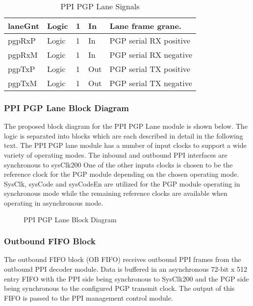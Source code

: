 \documentclass[11pt]{article}
\begin{document}
\begin{table}[H]
\begin{tabular}{| l | l | l | l | l | }
      \hline laneGnt           & Logic              & 1      & In        & Lane frame grane.             \\
      \hline pgpRxP            & Logic             & 1    & In        & PGP serial RX positive     \\
      \hline pgpRxM            & Logic             & 1  & In        & PGP serial RX negative     \\
      \hline pgpTxP            & Logic             & 1   & Out       & PGP serial TX positive     \\
      \hline pgpTxM            & Logic             & 1    & Out       & PGP serial TX negative     \\
      \hline
   \end{tabular}
   \caption{PPI PGP Lane Signals}
   \label{tab:ppi_pgp_lane_signals}
\end{table}

\subsubsection{PPI PGP Lane Block Diagram}

The proposed block diagram for the PPI PGP Lane module is shown below. The logic is separated into blocks which are each 
described in detail in the following text. The PPI PGP lane module has a number of input clocks to support a wide variety of operating
modes. The inbound and outbound PPI interfaces are synchronous to sysClk200 
One of the other inputs clocks is chosen to be the reference clock for the PGP module depending on the chosen operating mode. 
SysClk, sysCode and sysCodeEn are utilized for the PGP module operating in synchronous mode while the remaining 
reference clocks are available when operating in asynchronous mode.

\begin{figure}[H]
   \centering
   \caption{PPI PGP Lane Block Diagram}
   \label{fig:ppi_pgp_lane_block}
\end{figure}

\subsubsection{Outbound FIFO Block}

The outbound FIFO block (OB FIFO) receives outbound PPI frames from the outbound PPI decoder module. Data is buffered in an asynchronous 
72-bit x 512 entry FIFO with the PPI side being synchronous to SysClk200 and the PGP side being synchronous to the
configured PGP transmit clock. The output of this FIFO is passed to the PPI management control module.
\end{document}
